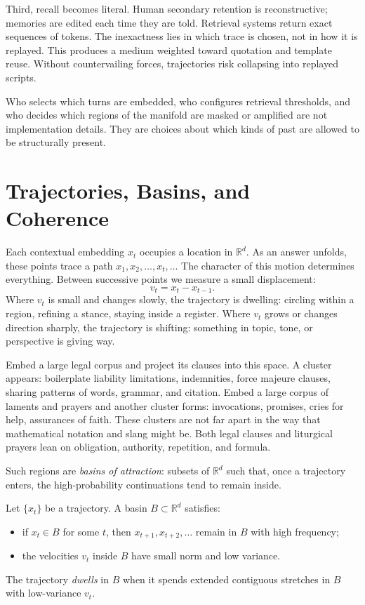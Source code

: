 \documentclass[12pt,a4paper]{article}
\begin{document}
Third, recall becomes literal. Human secondary retention is reconstructive; memories are edited each time they are told. Retrieval systems return exact sequences of tokens. The inexactness lies in which trace is chosen, not in how it is replayed. This produces a medium weighted toward quotation and template reuse. Without countervailing forces, trajectories risk collapsing into replayed scripts.

Who selects which turns are embedded, who configures retrieval thresholds, and who decides which regions of the manifold are masked or amplified are not implementation details. They are choices about which kinds of past are allowed to be structurally present.

\section{Trajectories, Basins, and Coherence}

Each contextual embedding $x_t$ occupies a location in $\mathbb{R}^d$. As an answer unfolds, these points trace a path $x_1, x_2, \ldots, x_t, \ldots$ The character of this motion determines everything. Between successive points we measure a small displacement:
\[
v_t = x_t - x_{t-1}.
\]
Where $v_t$ is small and changes slowly, the trajectory is dwelling: circling within a region, refining a stance, staying inside a register. Where $v_t$ grows or changes direction sharply, the trajectory is shifting: something in topic, tone, or perspective is giving way.

Embed a large legal corpus and project its clauses into this space. A cluster appears: boilerplate liability limitations, indemnities, force majeure clauses, sharing patterns of words, grammar, and citation. Embed a large corpus of laments and prayers and another cluster forms: invocations, promises, cries for help, assurances of faith. These clusters are not far apart in the way that mathematical notation and slang might be. Both legal clauses and liturgical prayers lean on obligation, authority, repetition, and formula.

Such regions are \emph{basins of attraction}: subsets of $\mathbb{R}^d$ such that, once a trajectory enters, the high-probability continuations tend to remain inside.

\begin{formalbox}[title={Basins and dwell}]
Let $\{x_t\}$ be a trajectory. A basin $B \subset \mathbb{R}^d$ satisfies:

\begin{itemize}
\item if $x_t \in B$ for some $t$, then $x_{t+1}, x_{t+2}, \ldots$ remain in $B$ with high frequency;
\item the velocities $v_t$ inside $B$ have small norm and low variance.
\end{itemize}

The trajectory \emph{dwells} in $B$ when it spends extended contiguous stretches in $B$ with low-variance $v_t$.
\end{formalbox}
\end{document}
